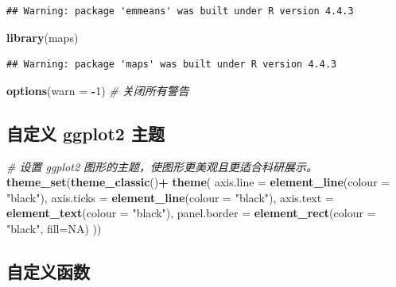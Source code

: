 \documentclass[
]{article}
\newenvironment{Shaded}{\begin{snugshade}}{\end{snugshade}}
\newcommand{\AttributeTok}[1]{\textcolor[rgb]{0.13,0.29,0.53}{#1}}
\newcommand{\CommentTok}[1]{\textcolor[rgb]{0.56,0.35,0.01}{\textit{#1}}}
\newcommand{\ConstantTok}[1]{\textcolor[rgb]{0.56,0.35,0.01}{#1}}
\newcommand{\DecValTok}[1]{\textcolor[rgb]{0.00,0.00,0.81}{#1}}
\newcommand{\FunctionTok}[1]{\textcolor[rgb]{0.13,0.29,0.53}{\textbf{#1}}}
\newcommand{\NormalTok}[1]{#1}
\newcommand{\SpecialCharTok}[1]{\textcolor[rgb]{0.81,0.36,0.00}{\textbf{#1}}}
\newcommand{\StringTok}[1]{\textcolor[rgb]{0.31,0.60,0.02}{#1}}
\begin{document}
\begin{verbatim}
## Warning: package 'emmeans' was built under R version 4.4.3
\end{verbatim}

\begin{Shaded}
\begin{Highlighting}[]
\FunctionTok{library}\NormalTok{(maps)}
\end{Highlighting}
\end{Shaded}

\begin{verbatim}
## Warning: package 'maps' was built under R version 4.4.3
\end{verbatim}

\begin{Shaded}
\begin{Highlighting}[]
\FunctionTok{options}\NormalTok{(}\AttributeTok{warn =} \SpecialCharTok{{-}}\DecValTok{1}\NormalTok{)  }\CommentTok{\# 关闭所有警告}
\end{Highlighting}
\end{Shaded}

\subsection{自定义 ggplot2
主题}\label{ux81eaux5b9aux4e49-ggplot2-ux4e3bux9898}

\begin{Shaded}
\begin{Highlighting}[]
\CommentTok{\# 设置 ggplot2 图形的主题，使图形更美观且更适合科研展示。}
\FunctionTok{theme\_set}\NormalTok{(}\FunctionTok{theme\_classic}\NormalTok{()}\SpecialCharTok{+} 
  \FunctionTok{theme}\NormalTok{(}
    \AttributeTok{axis.line =} \FunctionTok{element\_line}\NormalTok{(}\AttributeTok{colour =} \StringTok{"black"}\NormalTok{),}
    \AttributeTok{axis.ticks =} \FunctionTok{element\_line}\NormalTok{(}\AttributeTok{colour =} \StringTok{"black"}\NormalTok{),}
    \AttributeTok{axis.text =} \FunctionTok{element\_text}\NormalTok{(}\AttributeTok{colour =} \StringTok{"black"}\NormalTok{),}
    \AttributeTok{panel.border =} \FunctionTok{element\_rect}\NormalTok{(}\AttributeTok{colour =} \StringTok{"black"}\NormalTok{, }\AttributeTok{fill=}\ConstantTok{NA}\NormalTok{)}
\NormalTok{  ))}
\end{Highlighting}
\end{Shaded}

\subsection{自定义函数}\label{ux81eaux5b9aux4e49ux51fdux6570}
\end{document}
